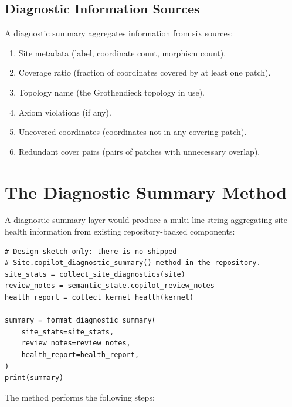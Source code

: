 \documentclass[11pt]{article}
\begin{document}
\subsection{Diagnostic Information Sources}

A diagnostic summary aggregates information from six sources:
\begin{enumerate}[leftmargin=2em]
  \item Site metadata (label, coordinate count, morphism count).
  \item Coverage ratio (fraction of coordinates covered by at least one patch).
  \item Topology name (the Grothendieck topology in use).
  \item Axiom violations (if any).
  \item Uncovered coordinates (coordinates not in any covering patch).
  \item Redundant cover pairs (pairs of patches with unnecessary overlap).
\end{enumerate}

\section{The Diagnostic Summary Method}\label{sec:diagnostic}

\begin{definition}\label{def:diagnostic}
A diagnostic-summary layer would produce a multi-line string
aggregating site health information from existing repository-backed
components:
\end{definition}

\begin{lstlisting}[style=jugeo-python]
# Design sketch only: there is no shipped
# Site.copilot_diagnostic_summary() method in the repository.
site_stats = collect_site_diagnostics(site)
review_notes = semantic_state.copilot_review_notes
health_report = collect_kernel_health(kernel)

summary = format_diagnostic_summary(
    site_stats=site_stats,
    review_notes=review_notes,
    health_report=health_report,
)
print(summary)
\end{lstlisting}

The method performs the following steps:
\end{document}

